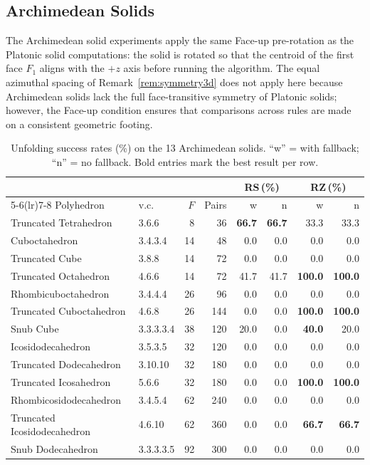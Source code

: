 \documentclass[12pt]{article}
\theoremstyle{definition}
\begin{document}
\subsection{Archimedean Solids}

The Archimedean solid experiments apply the same Face-up pre-rotation
as the Platonic solid computations: the solid is rotated so that the
centroid of the first face $F_1$ aligns with the $+z$ axis before
running the algorithm.
The equal azimuthal spacing of Remark~\ref{rem:symmetry3d} does not
apply here because Archimedean solids lack the full face-transitive
symmetry of Platonic solids; however, the Face-up condition ensures
that comparisons across rules are made on a consistent geometric footing.

\begin{table}[ht]
\centering
\caption{Unfolding success rates (\%) on the 13 Archimedean solids.
  ``w'' = with fallback; ``n'' = no fallback.
  Bold entries mark the best result per row.}
\label{tab:archimedean}
\renewcommand{\arraystretch}{1.2}
\small\setlength{\tabcolsep}{4pt}
\begin{tabular}{llrrrrrr}
\toprule
& & & & \multicolumn{2}{c}{RS\,(\%)} & \multicolumn{2}{c}{RZ\,(\%)} \\
\cmidrule(lr){5-6}\cmidrule(lr){7-8}
Polyhedron & v.c. & $F$ & Pairs & w & n & w & n \\
\midrule
Truncated Tetrahedron        & 3.6.6       &  8 &  36 & \textbf{66.7} & \textbf{66.7} & 33.3 & 33.3 \\
Cuboctahedron                & 3.4.3.4     & 14 &  48 &  0.0 &  0.0 &  0.0 &  0.0 \\
Truncated Cube               & 3.8.8       & 14 &  72 &  0.0 &  0.0 &  0.0 &  0.0 \\
Truncated Octahedron         & 4.6.6       & 14 &  72 & 41.7 & 41.7 & \textbf{100.0} & \textbf{100.0} \\
Rhombicuboctahedron          & 3.4.4.4     & 26 &  96 &  0.0 &  0.0 &  0.0 &  0.0 \\
Truncated Cuboctahedron      & 4.6.8       & 26 & 144 &  0.0 &  0.0 & \textbf{100.0} & \textbf{100.0} \\
Snub Cube                    & 3.3.3.3.4   & 38 & 120 & 20.0 &  0.0 & \textbf{40.0} & 20.0 \\
Icosidodecahedron            & 3.5.3.5     & 32 & 120 &  0.0 &  0.0 &  0.0 &  0.0 \\
Truncated Dodecahedron       & 3.10.10     & 32 & 180 &  0.0 &  0.0 &  0.0 &  0.0 \\
Truncated Icosahedron        & 5.6.6       & 32 & 180 &  0.0 &  0.0 & \textbf{100.0} & \textbf{100.0} \\
Rhombicosidodecahedron       & 3.4.5.4     & 62 & 240 &  0.0 &  0.0 &  0.0 &  0.0 \\
Truncated Icosidodecahedron  & 4.6.10      & 62 & 360 &  0.0 &  0.0 & \textbf{66.7} & \textbf{66.7} \\
Snub Dodecahedron            & 3.3.3.3.5   & 92 & 300 &  0.0 &  0.0 &  0.0 &  0.0 \\
\bottomrule
\end{tabular}
\end{table}
\end{document}
